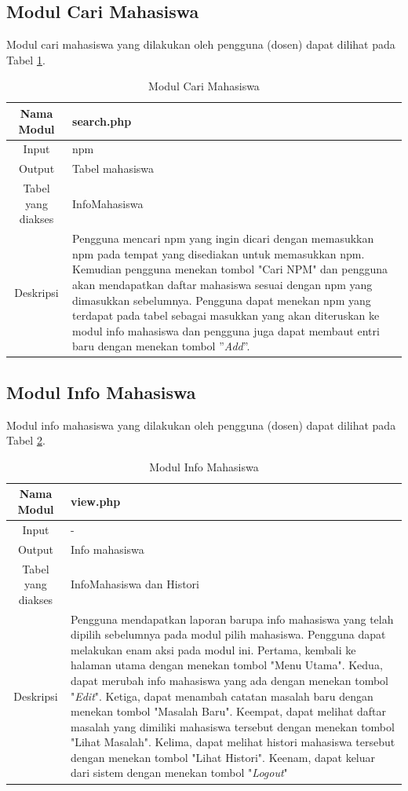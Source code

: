 \subsection{Modul Cari Mahasiswa}
Modul cari mahasiswa yang dilakukan oleh pengguna (dosen) dapat dilihat pada Tabel \ref{tab:modulcarimahasiswa}.

\begin{table}[ht]
\centering
\caption[Tabel Modul Cari Mahasiswa]{Modul Cari Mahasiswa}
\label{tab:modulcarimahasiswa}
\begin{tabular}{|c|p{10cm}|}
\hline
Nama Modul & search.php\\
\hline
Input & npm\\
\hline
Output & Tabel mahasiswa\\
\hline
Tabel yang diakses & InfoMahasiswa\\
\hline
Deskripsi & Pengguna mencari npm yang ingin dicari dengan memasukkan npm pada tempat yang disediakan untuk memasukkan npm. Kemudian pengguna menekan tombol "Cari NPM" dan pengguna akan mendapatkan daftar mahasiswa sesuai dengan npm yang dimasukkan sebelumnya. Pengguna dapat menekan npm yang terdapat pada tabel sebagai masukkan yang akan diteruskan ke modul info mahasiswa dan pengguna juga dapat membaut entri baru dengan menekan tombol ''{\it Add}''.\\
\hline
\end{tabular}
\end{table}

\subsection{Modul Info Mahasiswa}
Modul info mahasiswa yang dilakukan oleh pengguna (dosen) dapat dilihat pada
Tabel \ref{tab:modulinfomahasiswa}.

\begin{table}[ht]
\centering
\caption[Tabel Modul Info Mahasiswa]{Modul Info Mahasiswa}
\label{tab:modulinfomahasiswa}
\begin{tabular}{|c|p{10cm}|}
\hline
Nama Modul & view.php\\
\hline
Input & -\\
\hline
Output & Info mahasiswa\\
\hline
Tabel yang diakses & InfoMahasiswa dan Histori\\
\hline
Deskripsi & Pengguna mendapatkan laporan barupa info mahasiswa yang telah dipilih sebelumnya pada modul pilih mahasiswa. Pengguna dapat melakukan enam aksi pada modul ini. Pertama, kembali ke halaman utama dengan menekan tombol "Menu Utama". Kedua, dapat merubah info mahasiswa yang ada dengan menekan tombol "{\it Edit}". Ketiga, dapat menambah catatan masalah baru dengan menekan tombol "Masalah Baru". Keempat, dapat melihat daftar masalah yang dimiliki mahasiswa tersebut dengan menekan tombol "Lihat Masalah". Kelima, dapat melihat histori mahasiswa tersebut dengan menekan tombol "Lihat Histori". Keenam, dapat keluar dari sistem dengan menekan tombol "{\it Logout}"\\
\hline
\end{tabular}
\end{table}

